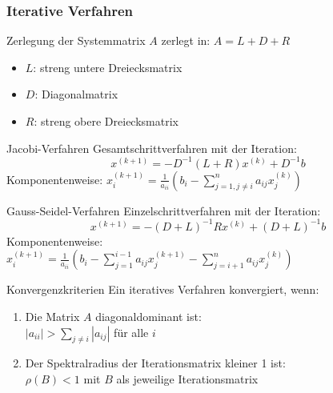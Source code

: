 \columnbreak

\subsubsection{Iterative Verfahren}

\begin{definition}{Zerlegung der Systemmatrix} $A$ zerlegt in: $A = L + D + R$
\begin{itemize}
    \item $L$: streng untere Dreiecksmatrix
    \item $D$: Diagonalmatrix
    \item $R$: streng obere Dreiecksmatrix
\end{itemize}
\end{definition}

\begin{concept}{Jacobi-Verfahren}
Gesamtschrittverfahren mit der Iteration:
\vspace{-1mm}\\
$$x^{(k+1)} = -D^{-1}(L + R)x^{(k)} + D^{-1}b$$
\vspace{-1mm}
Komponentenweise:
$x_i^{(k+1)} = \frac{1}{a_{ii}}\left(b_i - \sum_{j=1,j\neq i}^n a_{ij}x_j^{(k)}\right)$
\end{concept}

\begin{concept}{Gauss-Seidel-Verfahren}
Einzelschrittverfahren mit der Iteration:
\vspace{-1mm}\\
$$x^{(k+1)} = -(D+L)^{-1}Rx^{(k)} + (D+L)^{-1}b$$
Komponentenweise:\\
$x_i^{(k+1)} = \frac{1}{a_{ii}}\left(b_i - \sum_{j=1}^{i-1} a_{ij}x_j^{(k+1)} - \sum_{j=i+1}^n a_{ij}x_j^{(k)}\right)$

\end{concept}

\begin{theorem}{Konvergenzkriterien}
Ein iteratives Verfahren konvergiert, wenn:
\begin{enumerate}
    \item Die Matrix $A$ diagonaldominant ist:\\
    $|a_{ii}| > \sum_{j\neq i} |a_{ij}|$ für alle $i$
    \item Der Spektralradius der Iterationsmatrix kleiner 1 ist:\\
    $\rho(B) < 1$ mit $B$ als jeweilige Iterationsmatrix
\end{enumerate}
\end{theorem}

